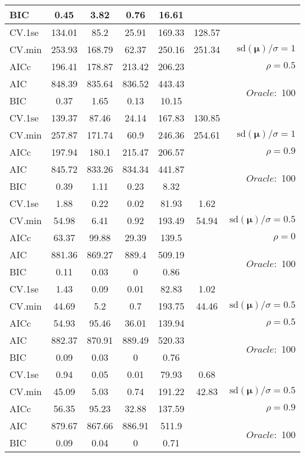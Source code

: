 \begin{table}
\begin{center}
\begin{tabular}{l*{5}{c}|r}
BIC & 0.45 & 3.82 & 0.76 & 16.61 & &  \\
 \hline 
CV.1se & 134.01 & 85.2 & 25.91 & 169.33 & 128.57 & \\
CV.min & 253.93 & 168.79 & 62.37 & 250.16 & 251.34 &  $\mathrm{sd}(\mathbf{\mu})/\sigma=1$ \\
AICc & 196.41 & 178.87 & 213.42 & 206.23 & & $\rho=0.5$ \\
AIC & 848.39 & 835.64 & 836.52 & 443.43 & &  \multirow{2}{*}{$Oracle: $ 100} \\
BIC & 0.37 & 1.65 & 0.13 & 10.15 & &  \\
 \hline 
CV.1se & 139.37 & 87.46 & 24.14 & 167.83 & 130.85 & \\
CV.min & 257.87 & 171.74 & 60.9 & 246.36 & 254.61 &  $\mathrm{sd}(\mathbf{\mu})/\sigma=1$ \\
AICc & 197.94 & 180.1 & 215.47 & 206.57 & & $\rho=0.9$ \\
AIC & 845.72 & 833.26 & 834.34 & 441.87 & &  \multirow{2}{*}{$Oracle: $ 100} \\
BIC & 0.39 & 1.11 & 0.23 & 8.32 & &  \\
 \hline 
CV.1se & 1.88 & 0.22 & 0.02 & 81.93 & 1.62 & \\
CV.min & 54.98 & 6.41 & 0.92 & 193.49 & 54.94 &  $\mathrm{sd}(\mathbf{\mu})/\sigma=0.5$ \\
AICc & 63.37 & 99.88 & 29.39 & 139.5 & & $\rho=0$ \\
AIC & 881.36 & 869.27 & 889.4 & 509.19 & &  \multirow{2}{*}{$Oracle: $ 100} \\
BIC & 0.11 & 0.03 & 0 & 0.86 & &  \\
 \hline 
CV.1se & 1.43 & 0.09 & 0.01 & 82.83 & 1.02 & \\
CV.min & 44.69 & 5.2 & 0.7 & 193.75 & 44.46 &  $\mathrm{sd}(\mathbf{\mu})/\sigma=0.5$ \\
AICc & 54.93 & 95.46 & 36.01 & 139.94 & & $\rho=0.5$ \\
AIC & 882.37 & 870.91 & 889.49 & 520.33 & &  \multirow{2}{*}{$Oracle: $ 100} \\
BIC & 0.09 & 0.03 & 0 & 0.76 & &  \\
 \hline 
CV.1se & 0.94 & 0.05 & 0.01 & 79.93 & 0.68 & \\
CV.min & 45.09 & 5.03 & 0.74 & 191.22 & 42.83 &  $\mathrm{sd}(\mathbf{\mu})/\sigma=0.5$ \\
AICc & 56.35 & 95.23 & 32.88 & 137.59 & & $\rho=0.9$ \\
AIC & 879.67 & 867.66 & 886.91 & 511.9 & &  \multirow{2}{*}{$Oracle: $ 100} \\
BIC & 0.09 & 0.04 & 0 & 0.71 & &  \\
 \hline 
\end{tabular}
\end{center}
\vspace{-1cm}
\end{table}




